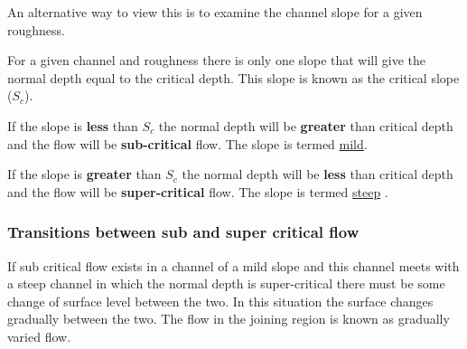 \documentclass[a4paper, 12pt, british]{article} %
\numberwithin{equation}{section}
\numberwithin{figure}{section}
\numberwithin{table}{section}
\begin{document}
An alternative way to view this is to examine the channel slope for a given roughness.

For a given channel and roughness there is only one slope that will give the normal depth equal to the critical depth. This slope is known as the critical slope ($S_c$).

If the slope is \textbf{less} than $S_c$ the normal depth will be \textbf{greater} than critical depth and the flow will be \textbf{sub-critical} flow. The slope is termed \underline{mild}.

If the slope is \textbf{greater} than $S_c$ the normal depth will be \textbf{less} than critical depth and the flow will be \textbf{super-critical} flow. The slope is termed \underline{steep}
.

\subsubsection{Transitions between sub and super critical flow}

If sub critical flow exists in a channel of a mild slope and this channel meets with a steep channel in which the normal depth is super-critical there must be some change of surface level between the two. In this situation the surface changes gradually between the two. The flow in the joining region is known as gradually varied flow.
\end{document}
